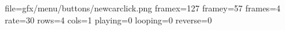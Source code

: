 file=gfx/menu/buttons/newcarclick.png
framex=127
framey=57
frames=4
rate=30
rows=4
cols=1
playing=0
looping=0
reverse=0